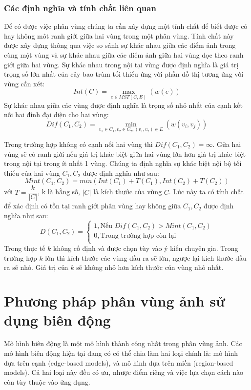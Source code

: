 \documentclass[12pt, oneside, a4]{book}
\begin{document}
\subsection{Các định nghĩa và tính chất liên quan}
Để có được việc phân vùng chúng ta cần xây dựng một tính chất để biết được có hay không môt ranh giới giữa hai vùng trong một phân vùng. Tính chất này được xây dựng thông qua việc so sánh sự khác nhau giữa các điểm ảnh trong cùng một vùng và sự khác nhau giữa các điểm ảnh giữa hai vùng dọc theo ranh giới giữa hai vùng.
Sự khác nhau trong nội tại vùng được định nghĩa là giá trị trọng số lớn nhất của cây bao trùm tối thiểu ứng với phần đồ thị tương ứng với vùng cần xét:
\begin{equation*}
Int(C)=\max_{e\in MST(C,E)}(w(e))
\end{equation*}
Sự khác nhau giữa các vùng được định nghĩa là trọng số nhỏ nhất của cạnh kết nối hai đỉnh đại diện cho hai vùng:
\begin{equation*}
Dif(C_1,C_2)=\min_{v_1\in C_1, v_2 \in C_2,(v_1, v_2) \in E}(w(v_i, v_j))
\end{equation*}

Trong trường hợp không có cạnh nối hai vùng thì $Dif(C_1,C_2)= \infty$. Gữa hai vùng sẽ có ranh giới nếu giá trị khác biệt giữa hai vùng lớn hơn giá trị khác biệt trong nội tại trong ít nhất 1 vùng. 
Chúng ta định nghĩa  sự khác biệt nội bộ tối thiểu của hai vùng $C_1, C_2$ được định nghĩa như sau: 
\begin{equation*}
Mint(C_1, C_2)= min(Int(C_1)+T(C_1),Int(C_2)+T(C_2))
\end{equation*}
với $T=\dfrac{k}{|C|}$, k là hằng số, $|C|$ là kích thước của vùng $C$. Lúc này ta có tính chất để xác định có tồn tại ranh giới phân vùng hay không giữa $C_1, C_2$  được định nghĩa như sau:
\begin{equation*}
D(C_1, C_2)=
\begin{cases}
 1, \textrm{Nếu } Dif(C_1, C_2)>Mint(C_1, C_2)\\
 0, \textrm{Trong trường hợp còn lại}\\
   \end{cases}
\end{equation*}
Trong thực tế $k$ không cố định và được chọn tùy vào ý kiến chuyên gia. Trong trường hợp $ k$ lớn thì kích thước các vùng đầu ra sẽ lớn, ngược lại kích thước đầu ra sẽ nhỏ. Giá trị của $k$ sẽ không nhỏ hơn kích thước  của vùng nhỏ nhất.
\chapter{Phương pháp phân vùng ảnh sử dụng biên động}
Mô hình biên động là một mô hình thành công nhất trong phân vùng ảnh. Các mô hình biên động hiện tại đang có có thể chia làm hai loại chính là: mô hình dựa trên cạnh (edge-based models), và mô hình dựa trên miền (region-based models). Cả hai loại này đều có ưu, nhược điểm riêng và việc lựa chọn cách nào còn tùy thuộc vào ứng dụng.
\end{document}
